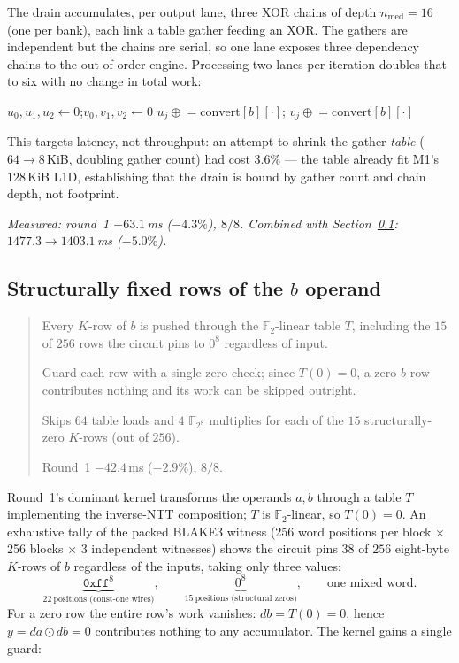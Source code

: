 \documentclass[11pt]{article}
\newcommand{\Ftwo}{\mathbb{F}_2}
\newcommand{\Feight}{\mathbb{F}_{2^8}}
\newenvironment{optsummary}{%
  \begin{quote}\small
  \begin{description}
  \setlength{\itemsep}{1pt}\setlength{\parsep}{0pt}\setlength{\topsep}{2pt}
}{%
  \end{description}
  \end{quote}
}
\begin{document}
The drain accumulates, per output lane, three XOR chains of depth
$n_{\mathrm{med}}=16$ (one per bank), each link a table gather feeding an XOR.
The gathers are independent but the chains are serial, so one lane exposes
three dependency chains to the out-of-order engine. Processing two lanes per
iteration doubles that to six with no change in total work:

\begin{algorithmic}[1]
  \State $u_0,u_1,u_2 \gets 0$;\quad $v_0,v_1,v_2 \gets 0$
    \State $u_j \mathrel{\oplus}= \mathrm{convert}[b][\cdot]$;\quad
           $v_j \mathrel{\oplus}= \mathrm{convert}[b][\cdot]$
  \EndFor
\EndFor
\end{algorithmic}

This targets latency, not throughput: an attempt to shrink the gather
\emph{table} ($64\to8\,$KiB, doubling gather count) had cost $3.6\%$ --- the
table already fit M1's $128\,$KiB L1D, establishing that the drain is bound by
gather count and chain depth, not footprint.

\emph{Measured: round~1 $-63.1\,$ms ($-4.3\%$), $8/8$. Combined with
Section~\ref{sec:zeroskip}: $1477.3\to1403.1\,$ms ($-5.0\%$).}

\subsection{Structurally fixed rows of the $b$ operand}\label{sec:zeroskip}

\begin{optsummary}
\item[Baseline:] Every $K$-row of $b$ is pushed through the $\Ftwo$-linear table $T$, including the $15$ of $256$ rows the circuit pins to $0^8$ regardless of input.
\item[Improvement:] Guard each row with a single zero check; since $T(0)=0$, a zero $b$-row contributes nothing and its work can be skipped outright.
\item[Mechanism:] Skips $64$ table loads and $4$ $\Feight$ multiplies for each of the $15$ structurally-zero $K$-rows (out of $256$).
\item[Result:] Round~1 $-42.4\,$ms ($-2.9\%$), $8/8$.
\end{optsummary}

Round~1's dominant kernel transforms the operands $a,b$ through a table $T$
implementing the inverse-NTT composition; $T$ is $\Ftwo$-linear, so
$T(0)=0$. An exhaustive tally of the packed BLAKE3 witness (256 word positions
per block $\times$ 256 blocks $\times$ 3 independent witnesses) shows the circuit
pins $38$ of $256$ eight-byte $K$-rows of $b$ regardless of the inputs, taking
only three values:
\[
\underbrace{\mathtt{0xff}^8}_{22\ \text{positions (const-one wires)}},\qquad
\underbrace{0^8}_{15\ \text{positions (structural zeros)}},\qquad
\text{one mixed word.}
\]
For a zero row the entire row's work vanishes: $db=T(0)=0$, hence
$y = da \odot db = 0$ contributes nothing to any accumulator. The kernel
gains a single guard:
\end{document}

